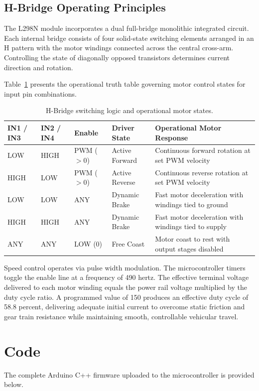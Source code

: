 \documentclass[11pt,a4paper]{article}
\begin{document}
\subsection{H-Bridge Operating Principles}
The L298N module incorporates a dual full-bridge monolithic integrated circuit. Each internal bridge consists of four solid-state switching elements arranged in an H pattern with the motor windings connected across the central cross-arm. Controlling the state of diagonally opposed transistors determines current direction and rotation.

Table~\ref{tab_truth} presents the operational truth table governing motor control states for input pin combinations.

\begin{table}[H]
\centering
\begin{tabularx}{\textwidth}{@{}l l l l X@{}}
\toprule
\textbf{IN1 / IN3} & \textbf{IN2 / IN4} & \textbf{Enable} & \textbf{Driver State} & \textbf{Operational Motor Response} \\
\midrule
LOW & HIGH & PWM ($>0$) & Active Forward & Continuous forward rotation at set PWM velocity \\
HIGH & LOW & PWM ($>0$) & Active Reverse & Continuous reverse rotation at set PWM velocity \\
LOW & LOW & ANY & Dynamic Brake & Fast motor deceleration with windings tied to ground \\
HIGH & HIGH & ANY & Dynamic Brake & Fast motor deceleration with windings tied to supply \\
ANY & ANY & LOW (0) & Free Coast & Motor coast to rest with output stages disabled \\
\bottomrule
\end{tabularx}
\caption{H-Bridge switching logic and operational motor states.}
\label{tab_truth}
\end{table}

Speed control operates via pulse width modulation. The microcontroller timers toggle the enable line at a frequency of 490 hertz. The effective terminal voltage delivered to each motor winding equals the power rail voltage multiplied by the duty cycle ratio. A programmed value of 150 produces an effective duty cycle of 58.8 percent, delivering adequate initial current to overcome static friction and gear train resistance while maintaining smooth, controllable vehicular travel.

\section{Code}
The complete Arduino C++ firmware uploaded to the microcontroller is provided below.
\end{document}
